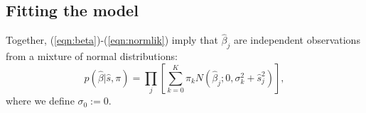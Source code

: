 \documentclass[11pt]{article}
\def\bhat{\hat{\beta}}
\def\shat{\hat{s}}
\begin{document}
% 
% 
 

\subsection*{Fitting the model}
 
Together, (\ref{eqn:beta})-(\ref{eqn:normlik}) imply that $\bhat_j$ are independent observations from a mixture of normal distributions:
\begin{equation} \label{eqn:marginallik}
p(\bhat | \shat, \pi) =   \prod_j  \left[\sum_{k=0}^K \pi_k N(\bhat_j; 0, \sigma_k^2 + \shat_j^2) \right],
\end{equation}
where we define $\sigma_0:=0$.
\end{document}
